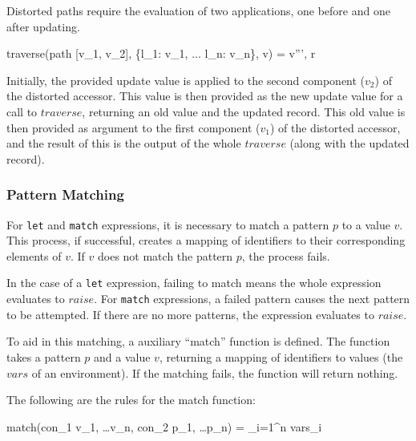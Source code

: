 \documentclass{article}
\begin{document}
\bigskip

Distorted paths require the evaluation of two applications, one before and one after updating.

    {traverse(path [v_1, \; v_2], \{l_1: v_1, ... l_n: v_n\}, v) = v''', r}

Initially, the provided update value is applied to the second component ($v_2$) of the distorted accessor.
This value is then provided as the new update value for a call to $traverse$, returning an old value and the updated record.
This old value is then provided as argument to the first component ($v_1$) of the distorted accessor, and the result of this is the output of the whole $traverse$ (along with the updated record).

\subsubsection{Pattern Matching}

For \texttt{let} and \texttt{match} expressions, it is necessary to match a pattern $p$ to a value $v$.
This process, if successful, creates a mapping of identifiers to their corresponding elements of $v$.
If $v$ does not match the pattern $p$, the process fails.

In the case of a \texttt{let} expression, failing to match means the whole expression evaluates to $raise$.
For \texttt{match} expressions, a failed pattern causes the next pattern to be attempted.
If there are no more patterns, the expression evaluates to $raise$.

\medskip

To aid in this matching, a auxiliary ``match'' function is defined.
The function takes a pattern $p$ and a value $v$, returning a mapping of identifiers to values (the $vars$ of an environment).
If the matching fails, the function will return nothing.

The following are the rules for the match function:



\smallskip

    {match(con_1 \; v_1, \; \dots v_n, con_2 \; p_1, \; \dots p_n) = \displaystyle\bigcup_{i=1}^{n} vars_i}
\end{document}

